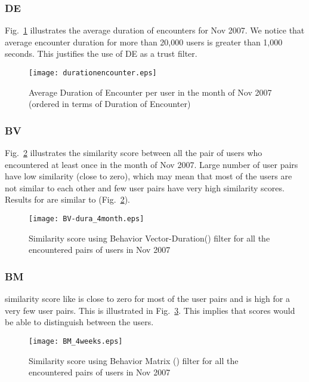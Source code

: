 \documentclass[10pt,conference]{IEEEtran}
\begin{document}
\subsubsection{DE}
Fig.~\ref{fig:DE} illustrates the average duration of encounters for Nov 2007. We notice that average encounter duration for more than 20,000 users is greater than 1,000 seconds. This justifies the use of DE as a trust filter.

\begin{figure}
\centering

\texttt{[image: durationencounter.eps]} 
\caption{Average Duration of Encounter per user in the month of Nov 2007 (ordered in terms of Duration of Encounter)}
\label{fig:DE}
\end{figure}

\subsubsection{BV}
 Fig.~\ref{fig:BV-dura} illustrates the similarity score between all the pair of users who encountered at least once in the month of Nov 2007. Large number of user pairs have low similarity (close to zero), which may mean that most of the users are not similar to each other and few user pairs have very high similarity scores. Results for  are similar to  (Fig.~\ref{fig:BV-dura}).


\begin{figure}
\centering
\texttt{[image: BV-dura\_4month.eps]} 
\caption{Similarity score using Behavior Vector-Duration() filter for all the encountered pairs of users in Nov 2007 }
\label{fig:BV-dura}
\end{figure}







\subsubsection{BM}

 similarity score like  is close to zero for most of the user pairs and is high for a very few user pairs. This is illustrated in Fig.~\ref{fig:BM}. This implies that  scores would be able to distinguish between the users. 

\begin{figure}
\centering

\texttt{[image: BM\_4weeks.eps]} 
\caption{Similarity score using Behavior Matrix () filter for all the encountered pairs of users in Nov 2007 }
\label{fig:BM}
\end{figure}
\end{document}

